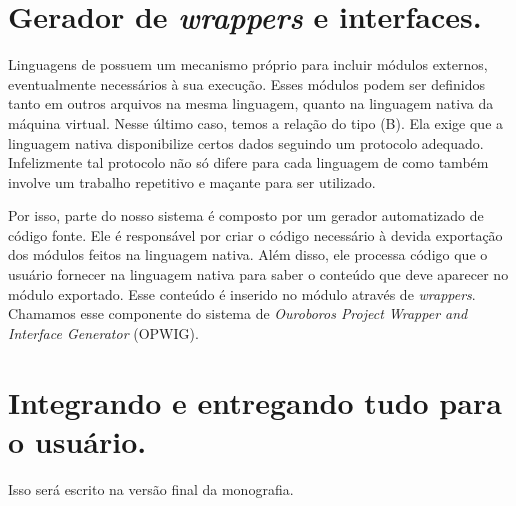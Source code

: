   
  \section{Gerador de \emph{wrappers} e interfaces.}
  \label{sec:estrutura:opwig}


    Linguagens de \script{} possuem um mecanismo próprio para incluir módulos
    externos, eventualmente necessários à sua execução. Esses módulos podem ser
    definidos tanto em outros arquivos na mesma linguagem, quanto na linguagem
    nativa da máquina virtual. Nesse último caso, temos a relação do tipo (B). Ela
    exige que a linguagem nativa disponibilize certos dados seguindo um protocolo
    adequado. Infelizmente tal protocolo não só difere para cada linguagem de
    \script{} como também involve um trabalho repetitivo e maçante para ser utilizado. 

    
    Por isso, parte do nosso sistema é composto por um gerador automatizado de código fonte.
    Ele é responsável por criar o código necessário à devida exportação dos módulos 
    feitos na linguagem nativa. Além disso, ele processa código que o usuário fornecer na
    linguagem nativa para saber o conteúdo que deve aparecer no módulo exportado.
    Esse conteúdo é inserido no módulo através de \emph{wrappers}. Chamamos esse componente
    do sistema de \emph{Ouroboros Project Wrapper and Interface Generator} (OPWIG).
  
  
  \section{Integrando e entregando tudo para o usuário.}
  \label{sec:estrutura:integration}

    Isso será escrito na versão final da monografia.
